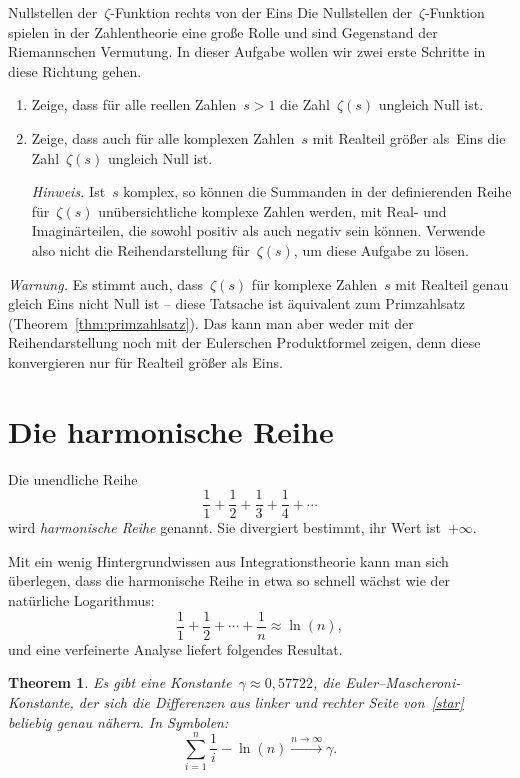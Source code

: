 \documentclass[twoside]{../zirkelblatt1415}
\theoremstyle{definition}
\theoremstyle{plain}
\newtheorem{thm}[defn]{Theorem}
\theoremstyle{remark}
\begin{document}
\begin{aufgabe}{Nullstellen der~$\zeta$-Funktion rechts von der Eins}
Die Nullstellen der~$\zeta$-Funktion spielen in der Zahlentheorie eine große
Rolle und sind Gegenstand der Riemannschen Vermutung. In dieser Aufgabe wollen
wir zwei erste Schritte in diese Richtung gehen.
\begin{enumerate}
\item Zeige, dass für alle reellen Zahlen~$s > 1$ die Zahl~$\zeta(s)$ ungleich
Null ist.
\item Zeige, dass auch für alle komplexen Zahlen~$s$ mit Realteil größer
als~Eins die Zahl~$\zeta(s)$ ungleich Null ist.

\emph{Hinweis.} Ist~$s$ komplex, so können die Summanden in der definierenden
Reihe für~$\zeta(s)$ unübersichtliche komplexe Zahlen werden, mit Real- und
Imaginärteilen, die sowohl positiv als auch negativ sein können. Verwende also
nicht die Reihendarstellung für~$\zeta(s)$, um diese Aufgabe zu lösen.
\end{enumerate}

\emph{Warnung.} Es stimmt auch, dass~$\zeta(s)$ für komplexe Zahlen~$s$ mit
Realteil genau gleich Eins nicht Null ist -- diese Tatsache ist äquivalent zum
Primzahlsatz (Theorem~\ref{thm:primzahlsatz}). Das kann man aber weder mit der
Reihendarstellung noch mit der Eulerschen Produktformel zeigen, denn diese
konvergieren nur für Realteil größer als Eins.
\end{aufgabe}


\section{Die harmonische Reihe}
\label{sect:harmonische-reihe}

Die unendliche Reihe
\[ \frac{1}{1} + \frac{1}{2} + \frac{1}{3} + \frac{1}{4} + \cdots \]
wird \emph{harmonische Reihe} genannt. Sie divergiert bestimmt, ihr Wert
ist~$+\infty$.

Mit ein wenig Hintergrundwissen aus Integrationstheorie kann man sich
überlegen, dass die harmonische Reihe in etwa so schnell wächst wie der
natürliche Logarithmus:
\begin{equation}
  \label{star}
  \tag{$\star$}
  \frac{1}{1} + \frac{1}{2} + \cdots + \frac{1}{n} \approx \ln(n),
\end{equation}
und eine verfeinerte Analyse liefert folgendes Resultat.

\begin{thm}Es gibt eine Konstante~$\gamma \approx 0{,}57722$, die
\emph{Euler--Mascheroni-Konstante}, der sich die Differenzen aus linker und
rechter Seite von~\eqref{star} beliebig genau nähern. In Symbolen:
\[ \sum_{i=1}^n \frac{1}{i} - \ln(n) \xrightarrow{n \to \infty}
\gamma. \]
\end{thm}
\end{document}
